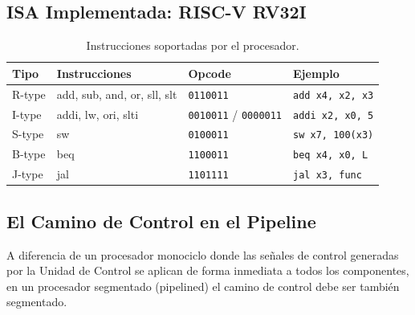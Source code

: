 \documentclass[12pt, a4paper]{article}
\begin{document}
\subsection{ISA Implementada: RISC-V RV32I}

\begin{table}[H]
\centering
\begin{tabular}{llll}
\toprule
\textbf{Tipo} & \textbf{Instrucciones} & \textbf{Opcode} & \textbf{Ejemplo} \\
\midrule
R-type  & add, sub, and, or, sll, slt & \texttt{0110011} & \texttt{add x4, x2, x3} \\
I-type  & addi, lw, ori, slti         & \texttt{0010011} / \texttt{0000011} & \texttt{addi x2, x0, 5} \\
S-type  & sw                          & \texttt{0100011} & \texttt{sw x7, 100(x3)} \\
B-type  & beq                         & \texttt{1100011} & \texttt{beq x4, x0, L} \\
J-type  & jal                         & \texttt{1101111} & \texttt{jal x3, func} \\
\bottomrule
\end{tabular}
\caption{Instrucciones soportadas por el procesador.}
\end{table}

\subsection{El Camino de Control en el Pipeline}

A diferencia de un procesador monociclo donde las señales de control generadas por la Unidad de Control se aplican de forma inmediata a todos los componentes, en un procesador segmentado (pipelined) el camino de control debe ser también segmentado.
\end{document}
